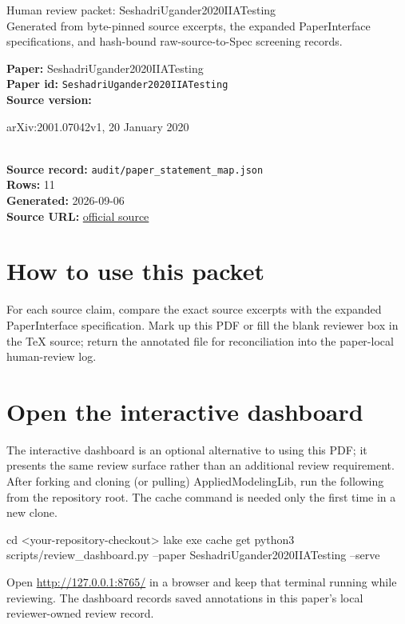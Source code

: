 \documentclass[10pt]{article}
\begin{document}
\fontsize{9}{10}\selectfont

\begin{center}
{\LARGE Human review packet: SeshadriUgander2020IIATesting}\\[0.35em]
\small Generated from byte-pinned source excerpts, the expanded PaperInterface
specifications, and hash-bound raw-source-to-Spec screening records.
\end{center}

\noindent\textbf{Paper:} SeshadriUgander2020IIATesting\\
\textbf{Paper id:} \texttt{SeshadriUgander2020IIATesting}\\
\textbf{Source version:} \parbox[t]{0.76\linewidth}{\raggedright arXiv:2001.07042v1, 20 January 2020}\\
\textbf{Source record:} \texttt{audit/paper\_statement\_map.json}\\
\textbf{Rows:} 11\\
\textbf{Generated:} 2026-09-06\\
\textbf{Source URL:} \href{https://arxiv.org/abs/2001.07042v1}{official source}





\section*{How to use this packet}
For each source claim, compare the exact source excerpts with the expanded
PaperInterface specification. Mark up this PDF or fill the blank reviewer box in the TeX source;
return the annotated file for reconciliation into the paper-local human-review
log.

\section*{Open the interactive dashboard}
The interactive dashboard is an optional alternative to using this PDF; it
presents the same review surface rather than an additional review requirement.
After forking and cloning (or pulling) AppliedModelingLib, run the following from the
repository root. The cache command is needed only the first time in a new clone.
\begin{ReviewVerbatim}
cd <your-repository-checkout>
lake exe cache get
python3 scripts/review_dashboard.py --paper SeshadriUgander2020IIATesting --serve
\end{ReviewVerbatim}
Open \url{http://127.0.0.1:8765/} in a browser and keep that terminal running
while reviewing. The dashboard records saved annotations in this paper's local
reviewer-owned review record.
\end{document}
